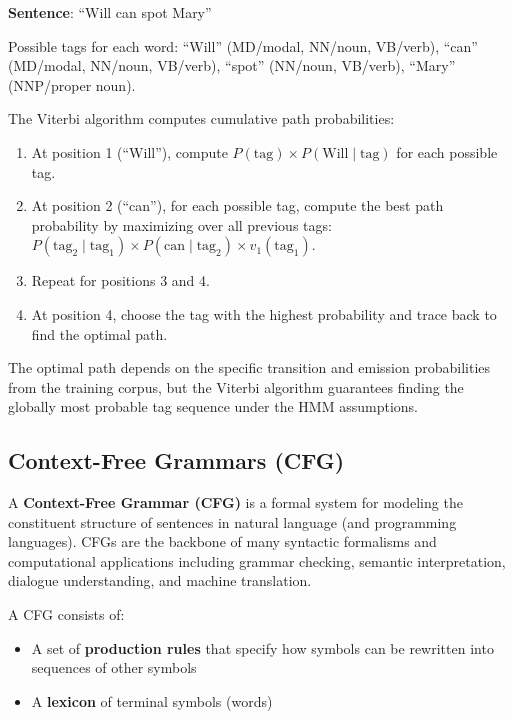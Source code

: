 \documentclass[11pt,a4paper]{article}
\begin{document}
\begin{tcolorbox}[colback=green!5!white,colframe=green!75!black,title=\textbf{Numerical: HMM Tagging with Viterbi}]
\textbf{Sentence}: ``Will can spot Mary''

Possible tags for each word: ``Will'' (MD/modal, NN/noun, VB/verb), ``can'' (MD/modal, NN/noun, VB/verb), ``spot'' (NN/noun, VB/verb), ``Mary'' (NNP/proper noun).

The Viterbi algorithm computes cumulative path probabilities:
\begin{enumerate}
    \item At position 1 (``Will''), compute $P(\text{tag}) \times P(\text{Will} \mid \text{tag})$ for each possible tag.
    \item At position 2 (``can''), for each possible tag, compute the best path probability by maximizing over all previous tags: $P(\text{tag}_2 \mid \text{tag}_1) \times P(\text{can} \mid \text{tag}_2) \times v_1(\text{tag}_1)$.
    \item Repeat for positions 3 and 4.
    \item At position 4, choose the tag with the highest probability and trace back to find the optimal path.
\end{enumerate}

The optimal path depends on the specific transition and emission probabilities from the training corpus, but the Viterbi algorithm guarantees finding the globally most probable tag sequence under the HMM assumptions.
\end{tcolorbox}

\subsection{Context-Free Grammars (CFG)}

A \textbf{Context-Free Grammar (CFG)} is a formal system for modeling the constituent structure of sentences in natural language (and programming languages). CFGs are the backbone of many syntactic formalisms and computational applications including grammar checking, semantic interpretation, dialogue understanding, and machine translation.

A CFG consists of:
\begin{itemize}
    \item A set of \textbf{production rules} that specify how symbols can be rewritten into sequences of other symbols
    \item A \textbf{lexicon} of terminal symbols (words)
\end{itemize}
\end{document}
